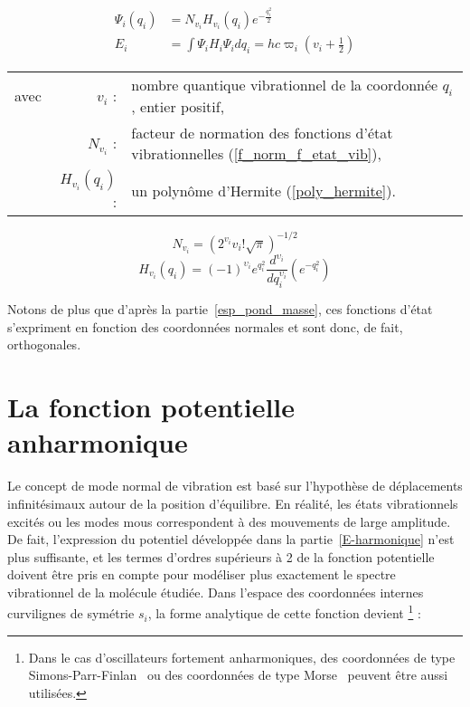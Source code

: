 \begin{align}
\Psi_i\left(q_i\right) &= N_{v_i} H_{v_i} \left(q_i\right) e^{-\frac{q^2_i}{2}} \\
E_i &= \int \Psi_i H_i \Psi_i dq_i = hc \varpi_i\left(v_i + \frac{1}{2}\right)
\end{align}
\begin{tabular}{@{}lrp{14cm}}
	avec & $v_i$ : & nombre quantique vibrationnel de la coordonnée $q_i$, entier positif,\\
	& $N_{v_i}$ : & facteur de normation des fonctions d'état vibrationnelles (\ref{f_norm_f_etat_vib}),\\
	& $H_{v_i}(q_i)$ : & un polynôme d'Hermite (\ref{poly_hermite}).\\
\end{tabular}


\begin{equation}
N_{v_i} = \left(2^{v_i} v_i ! \sqrt{\pi} \right)^{-1/2}
\label{f_norm_f_etat_vib}
\end{equation}
\begin{equation}
H_{v_i}(q_i) = (-1)^{\upsilon_i} e^{q_{i}^{2}} \frac{d^{\upsilon_i}}{dq_{i}^{\upsilon_i}} \left(e^{-q_{i}^{2}} \right)
\label{poly_hermite}
\end{equation}

Notons de plus que d'après la partie~\ref{esp_pond_masse}, ces fonctions d'état s'expriment en fonction des coordonnées normales et sont donc, de fait, orthogonales.





\section{La fonction potentielle anharmonique}

Le concept de mode normal de vibration est basé sur l'hypothèse de déplacements infinitésimaux autour de la position d'équilibre. En réalité, les états vibrationnels excités ou les modes mous correspondent à des mouvements de large amplitude. De fait, l'expression du potentiel développée dans la partie~\ref{E-harmonique} n'est plus suffisante, et les termes d'ordres supérieurs à 2 de la fonction potentielle doivent être pris en compte pour modéliser plus exactement le spectre vibrationnel de la molécule étudiée. Dans l'espace des coordonnées internes curvilignes de symétrie $s_i$, la forme analytique de cette fonction devient \footnote{Dans le cas d'oscillateurs fortement anharmoniques, des coordonnées de type Simons-Parr-Finlan~\cite{simons1973new} ou des coordonnées de type Morse~\cite{meyer1986abinitio} peuvent être aussi utilisées.} :

